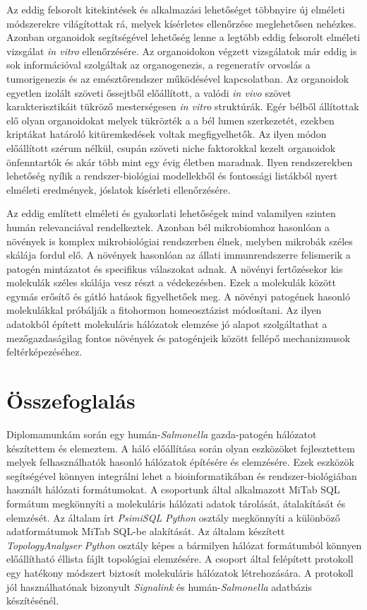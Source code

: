 \documentclass[a4paper,12pt]{article}
\begin{document}
		Az eddig felsorolt kitekintések és alkalmazási lehetőséget többnyire új elméleti módszerekre világítottak rá, melyek kísérletes ellenőrzése meglehetősen nehézkes. Azonban organoidok segítségével lehetőség lenne a legtöbb eddig felsorolt elméleti vizsgálat \textit{in vitro} ellenőrzésére. Az organoidokon végzett vizsgálatok már eddig is sok információval szolgáltak az organogenezis, a regeneratív orvoslás a tumorigenezis és az emésztőrendszer működésével kapcsolatban. Az organoidok egyetlen izolált szöveti őssejtből előállított, a valódi \textit{in vivo} szövet karakterisztikáit tükröző mesterségesen \textit{in vitro} struktúrák. \cite{organoid}
		Egér bélből állítottak elő olyan organoidokat melyek tükrözték a a bél lumen szerkezetét, ezekben kriptákat határoló kitüremkedések voltak megfigyelhetők. Az ilyen módon előállított szérum nélkül, csupán szöveti niche faktorokkal kezelt organoidok önfenntartók és akár több mint egy évig életben maradnak. \cite{organoid} Ilyen rendszerekben lehetőség nyílik a rendszer-biológiai modellekből és fontossági listákból nyert elméleti eredmények, jóslatok kísérleti ellenőrzésére.
		
		Az eddig említett elméleti és gyakorlati lehetőségek mind valamilyen szinten humán relevanciával rendelkeztek. Azonban bél mikrobiomhoz hasonlóan a növények is komplex mikrobiológiai rendszerben élnek, melyben mikrobák széles skálája fordul elő. 
		A növények hasonlóan az állati immunrendszerre felismerik a patogén mintázatot és specifikus válaszokat adnak. A növényi fertőzésekor kis molekulák széles skálája vesz részt a védekezésben. Ezek a molekulák között egymás erősítő és gátló hatások figyelhetőek meg. A növényi patogének hasonló molekulákkal próbálják a fitohormon homeosztázist módosítani. \cite{discussion_plant_network} Az ilyen adatokból épített molekuláris hálózatok elemzése jó alapot szolgáltathat a mezőgazdaságilag fontos növények és patogénjeik között fellépő mechanizmusok feltérképezéséhez.
		
		\pagebreak

\section{Összefoglalás}
		
		Diplomamunkám során egy humán-\textit{Salmonella} gazda-patogén hálózatot készítettem és elemeztem. A háló előállítása során olyan eszközöket fejlesztettem melyek felhasználhatók hasonló hálózatok építésére és elemzésére. Ezek eszközök segítségével könnyen integrálni lehet a bioinformatikában és rendszer-biológiában használt hálózati formátumokat. A csoportunk által alkalmazott MiTab SQL formátum megkönnyíti a molekuláris hálózati adatok tárolását, átalakítását és elemzését. Az általam írt \textit{PsimiSQL} \textit{Python} osztály megkönnyíti a különböző adatformátumok MiTab SQL-be alakítását. Az általam készített \textit{TopologyAnalyser} \textit{Python} osztály képes a  bármilyen hálózat formátumból könnyen előállítható éllista fájlt topológiai elemzésére.  A csoport által felépített protokoll egy hatékony módszert biztosít molekuláris hálózatok létrehozására. A protokoll jól használhatónak bizonyult \textit{Signalink} és humán-\textit{Salmonella} adatbázis készítésénél.
		
\end{document}
